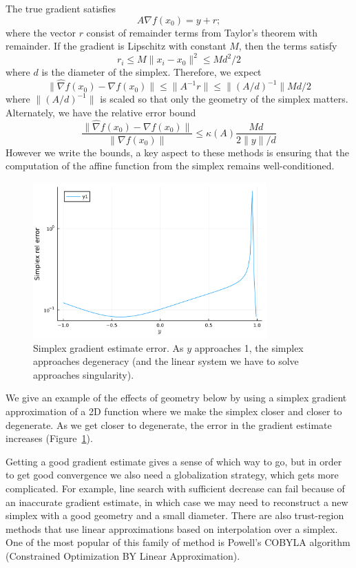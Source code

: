 \documentclass[12pt, leqno]{article} %
\begin{document}
The true gradient satisfies \[A \nabla f(x_0) = y + r;\] where the
vector \(r\) consist of remainder terms from Taylor's theorem with
remainder. If the gradient is Lipschitz with constant \(M\), then the
terms satisfy \[r_i \leq M \|x_i-x_0\|^2 \leq M d^2/2\] where \(d\) is
the diameter of the simplex. Therefore, we expect
\[\|\hat{\nabla} f(x_0) - \nabla f(x_0)\| \leq 
  \|A^{-1} r\| \leq \|(A/d)^{-1}\| Md/2\] where \(\|(A/d)^{-1}\|\) is
scaled so that only the geometry of the simplex matters. Alternately, we
have the relative error bound
\[\frac{\|\hat{\nabla} f(x_0) - \nabla f(x_0)\|}{\|\nabla f(x_0)\|} \leq 
  \kappa(A) \frac{Md}{2\|y\|/d}\] However we write the bounds, a key
aspect to these methods is ensuring that the computation of the affine
function from the simplex remains well-conditioned.

\begin{figure}
\begin{center}
\includegraphics[width=0.8\textwidth]{fig/2023-05-01-simplex-err.pdf}
\end{center}
\caption{Simplex gradient estimate error.  As $y$ approaches 1, the simplex
  approaches degeneracy (and the linear system we have to solve approaches
  singularity).}
\label{fig:simplex-err}
\end{figure}

We give an example of the effects of geometry below by using a simplex
gradient approximation of a 2D function where we make the simplex closer
and closer to degenerate.  As we get closer to degenerate, the error in
the gradient estimate increases (Figure~\ref{fig:simplex-err}).

Getting a good gradient estimate gives a sense of which way to go, but
in order to get good convergence we also need a globalization strategy,
which gets more complicated. For example, line search with sufficient
decrease can fail because of an inaccurate gradient estimate, in which
case we may need to reconstruct a new simplex with a good geometry and a
small diameter. There are also trust-region methods that use linear
approximations based on interpolation over a simplex. One of the most
popular of this family of method is Powell's COBYLA algorithm
(Constrained Optimization BY Linear Approximation).
\end{document}

